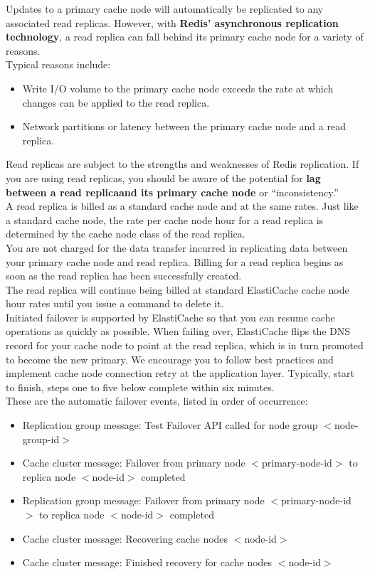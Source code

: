 \documentclass[12pt, letterpaper, twoside]{article}
\begin{document}
Updates to a primary cache node will automatically be replicated to any associated read replicas. However, with \textbf{Redis’ 
asynchronous replication technology}, a read replica can fall behind its primary cache node for a variety of reasons.\\
Typical reasons include:

\begin{itemize}
	\item Write I/O volume to the primary cache node exceeds the rate at which changes can be applied to the read replica.
	\item Network partitions or latency between the primary cache node and a read replica.
\end{itemize}

Read replicas are subject to the strengths and weaknesses of Redis replication. If you are using read replicas, 
you should be aware of the potential for \textbf{lag between a read replicaand its primary cache node} or “inconsistency.”\\

A read replica is billed as a standard cache node and at the same rates. Just like a standard cache node, the rate per cache 
node hour for a read replica is determined by the cache node class of the read replica.\\
You are not charged for the data transfer incurred in replicating data between your primary cache node and read replica. 
Billing for a read replica begins as soon as the read replica has been successfully created.\\
The read replica will continue being billed at standard ElastiCache cache node hour rates until you issue a command to 
delete it.\\

Initiated failover is supported by ElastiCache so that you can resume cache operations as quickly as possible. When failing 
over, ElastiCache flips the DNS record for your cache node to point at the read replica, which is in turn promoted to become 
the new primary. We encourage you to follow best practices and implement cache node connection retry at the application layer. 
Typically, start to finish, steps one to five below complete within six minutes.\\

These are the automatic failover events, listed in order of occurrence:
\begin{itemize}
	\item Replication group message: Test Failover API called for node group $<$node-group-id$>$
	\item Cache cluster message: Failover from primary node $<$primary-node-id$>$ to replica node $<$node-id$>$ completed
	\item Replication group message: Failover from primary node $<$primary-node-id$>$ to replica node $<$node-id$>$ completed
	\item Cache cluster message: Recovering cache nodes $<$node-id$>$
	\item Cache cluster message: Finished recovery for cache nodes $<$node-id$>$
\end{itemize}
\end{document}
